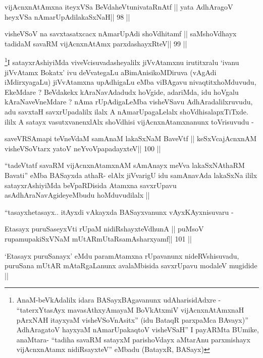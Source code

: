 \begin{shl}
vijAcnxnAtAmxna iteyxVSa BeVdaheVtunivataRnAtf ||
yata AdhAragoV heyxVSa nAmarUpAdilakaSxNaH\hfill || 98 ||
\end{shl}

\begin{shl}
visheVSoV na savxtasatxcacx nAmarUpAdi shoVdhitamf ||
saMshoVdhayx tadidaM savaRM vijAcnxnAtAmx parxdashayxRteV\hfill || 99 ||
\end{shl}

\begin{artha}
\footnote[1]{AnaM-beVkAdalilx idara BASayxBAgavanunx udAharisidAdxre -
``taterxYtasAyx mavasAthxyAmayaM BoVkAtx\s miV vijAcnxnAtAmxnaH
  pArxNAH itayxyaM visheVSoVnAsitx'' (idu BataqR parxpaMca BAvayx)''
  AdhAragatoV hayxyaM nAmarUpakaqtoV visheVSaH'' I payARMta BUmike,
  anaMtara- ``tadiha savaRM satayxM parishoVdayx aMtarA\s nu
  parxmishayx vijAcnxnAtamx nidiRsayxteV'' eMbadu (BatayxR, BASayx)}I satayxrAshiyiMda viveVcisuvadasheyalilx jiVvAtamxnu
irutitxralu `ivanu jiVvAtamx Bokatx' ivu deVvategaLu
aBimAnisikoMDiruva (vAgAdi iMdirxyagaLu) jiVvAtamxna upAdhigaLu eMba
viBAgavu nivaqtitxhoMduvudu, EkeMdare ? BeVdakekx kAraNavAdadudx
hoVgide, adariMda, idu hoVgalu kAraNaveVneMdare ? nAma rUpAdigaLeMba
visheVSavu AdhAradalilxruvudu, adu savxtaH savxrUpadalilx ilalx A
nAmarUpagaLelalx shoVdhisalapxTiTxde. ililx A satayx vasutxvanenxlAlx
shoVdhisi vijAcnxnAtamxnanunx toVrisuvudu -
\end{artha}

\begin{shl}
saveVRSAmapi teVneVdaM samAnaM lakaSxNaM BaveVtf ||
keSxVcajAcnxnAM visheVSoV\s tarx yatoV neYvoVpapadayxteV\hfill || 100 ||
\end{shl}

\begin{artha}
``tadeVtatf savaRM vijAcnxnAtamxnAM sAmAnayx meVva lakaSxNAthaRM
  Bavati'' eMba BASayxda athaR- elAlx jiVvarigU idu samAnavAda
  lakaSxNa ililx satayxrAshiyiMda beVpaRDisida Atamxna savxrUpavu
  asAdhAraNavAgideyeMbudu hoMduvudilalx ||

``tasayxhe\s tasayx.. itAyxdi vAkayxda BASayxvanunx vAyxKAyxnisuvaru -
\end{artha}

\begin{shl}
Etasayx puruSaseyxVti rUpaM nidiRshayxteV\s dhunA ||
puMsoV rupamupakiSxVNaM mUtARmUtaRsamAsharxyamf\hfill || 101 ||
\end{shl}

\begin{artha}
`Etasayx puruSanayx' eMdu paramAtamxna rUpavanunx nideRVshisuvadu,
  puruSana mUtAR mAtaRgaLanunx avalaMbisida savxrUpavu modaleV
  mugidide ||
\end{artha}

